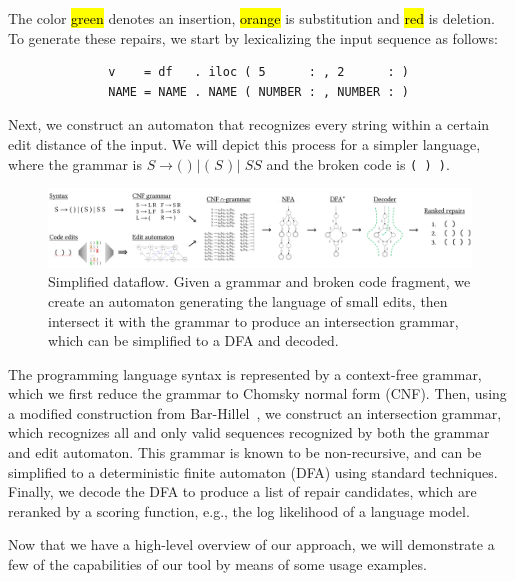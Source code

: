 \documentclass[runningheads]{llncs}
\DeclareRobustCommand{\hlred}[1]{{\sethlcolor{lred}\hl{#1}}}
\DeclareRobustCommand{\hlorange}[1]{{\sethlcolor{lorange}\hl{#1}}}
\DeclareRobustCommand{\hlgreen}[1]{{\sethlcolor{lgreen}\hl{#1}}}
\begin{document}
\vspace{-0.3cm}\noindent The color \hlgreen{green} denotes an insertion, \hlorange{orange} is substitution and \hlred{red} is deletion. To generate these repairs, we start by lexicalizing the input sequence as follows:

\begin{verbatim}
              v    = df   . iloc ( 5      : , 2      : )
              NAME = NAME . NAME ( NUMBER : , NUMBER : )
\end{verbatim}

\noindent Next, we construct an automaton that recognizes every string within a certain edit distance of the input. We will depict this process for a simpler language, where the grammar is $S \rightarrow \texttt{( )} \mid \texttt{( } S \texttt{ )} \mid S S$ and the broken code is \texttt{( ) )}.\vspace{-0.3cm}

\begin{figure}[h!]
  \includegraphics[width=\textwidth]{flow.pdf}\vspace{-1pt}
  \caption{Simplified dataflow. Given a grammar and broken code fragment, we create an automaton generating the language of small edits, then intersect it with the grammar to produce an intersection grammar, which can be simplified to a DFA and decoded.}\label{fig:arch_simp}
\end{figure}\vspace{-0.3cm}

The programming language syntax is represented by a context-free grammar, which we first reduce the grammar to Chomsky normal form (CNF). Then, using a modified construction from Bar-Hillel~\cite{bar1961formal}, we construct an intersection grammar, which recognizes all and only valid sequences recognized by both the grammar and edit automaton. This grammar is known to be non-recursive, and can be simplified to a deterministic finite automaton (DFA) using standard techniques. Finally, we decode the DFA to produce a list of repair candidates, which are reranked by a scoring function, e.g., the log likelihood of a language model.

Now that we have a high-level overview of our approach, we will demonstrate a few of the capabilities of our tool by means of some usage examples.
\end{document}
